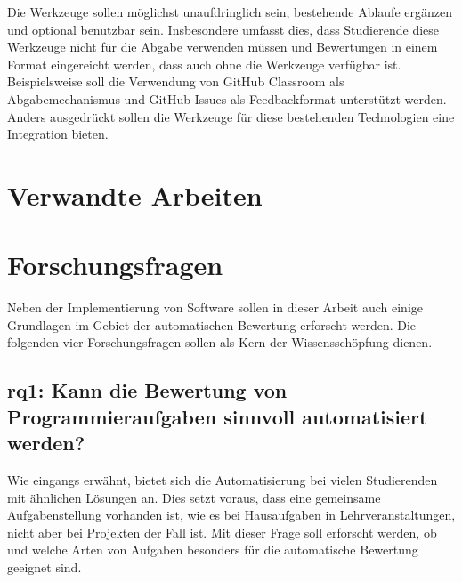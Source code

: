Die Werkzeuge sollen möglichst unaufdringlich sein, bestehende Ablaufe ergänzen und optional benutzbar sein.
Insbesondere umfasst dies, dass Studierende diese Werkzeuge nicht für die Abgabe verwenden müssen und Bewertungen in einem Format eingereicht werden, dass auch ohne die Werkzeuge verfügbar ist.
Beispielsweise soll die Verwendung von GitHub Classroom als Abgabemechanismus und GitHub Issues als Feedbackformat unterstützt werden.
Anders ausgedrückt sollen die Werkzeuge für diese bestehenden Technologien eine Integration bieten.

\section{Verwandte Arbeiten}\label{sec:related-work}


\section{Forschungsfragen}\label{sec:research-questions}

Neben der Implementierung von Software sollen in dieser Arbeit auch einige Grundlagen im Gebiet der automatischen Bewertung erforscht werden.
Die folgenden vier Forschungsfragen sollen als Kern der Wissensschöpfung dienen.

\subsection[\acs{rq}1]{\ac{rq}1: Kann die Bewertung von Programmieraufgaben sinnvoll automatisiert werden?}\label{subsec:rq1-useful-automation}

Wie eingangs erwähnt, bietet sich die Automatisierung bei vielen Studierenden mit ähnlichen Lösungen an.
Dies setzt voraus, dass eine gemeinsame Aufgabenstellung vorhanden ist, wie es bei Hausaufgaben in Lehrveranstaltungen, nicht aber bei Projekten der Fall ist.
Mit dieser Frage soll erforscht werden, ob und welche Arten von Aufgaben besonders für die automatische Bewertung geeignet sind.

